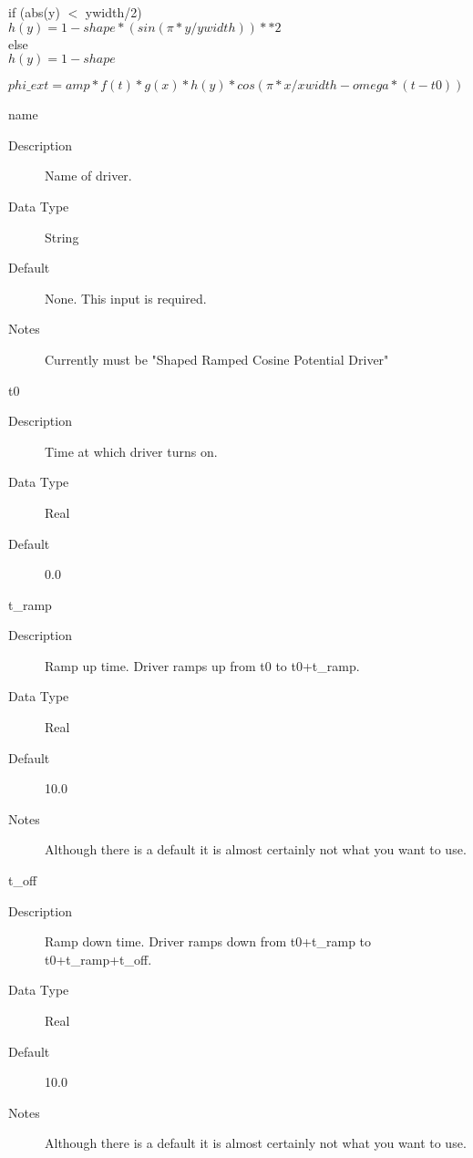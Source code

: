 \documentclass[11pt]{amsart}
\begin{document}
\noindent if (abs(y) $<$ ywidth/2) \\
\indent \begin{math} h(y) = 1-shape*(sin(\pi*y/ywidth))**2 \end{math} \\
else \\
\indent \begin{math} h(y) = 1-shape \end{math}

\noindent \begin{math}phi\_ext = amp*f(t)*g(x)*h(y)*cos(\pi*x/xwidth-omega*(t-t0)) \end{math}

name
\begin{description}
\item [Description] Name of driver.
\item [Data Type] String
\item [Default] None.  This input is required.
\item [Notes] Currently must be "Shaped Ramped Cosine Potential Driver"
\end{description}

t0
\begin{description}
\item [Description] Time at which driver turns on.
\item [Data Type] Real
\item [Default] 0.0
\end{description}

t\_ramp
\begin{description}
\item [Description] Ramp up time.  Driver ramps up from t0 to t0+t\_ramp.
\item [Data Type] Real
\item [Default] 10.0
\item [Notes] Although there is a default it is almost certainly not what you
want to use.
\end{description}

t\_off
\begin{description}
\item [Description] Ramp down time.  Driver ramps down from t0+t\_ramp to \\
t0+t\_ramp+t\_off.
\item [Data Type] Real
\item [Default] 10.0
\item [Notes] Although there is a default it is almost certainly not what you
want to use.
\end{description}
\end{document}
